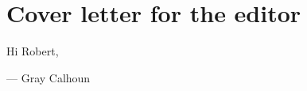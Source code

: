 \documentclass[12pt]{article}
\begin{document}
\section*{\hfill Cover letter for the editor\hfill}

Hi Robert,

\strut

\noindent --- Gray Calhoun
\end{document}
